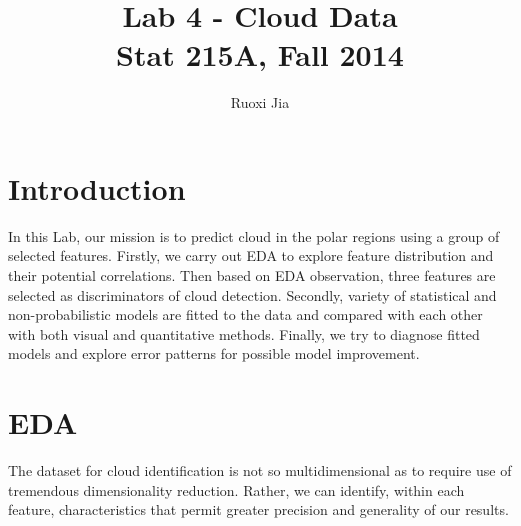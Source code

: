 \documentclass[english]{article}\usepackage{graphicx, color}
\numberwithin{equation}{section}
\numberwithin{figure}{section}
\begin{document}
\title{Lab 4 - Cloud Data\\
Stat 215A, Fall 2014}


\author{Ruoxi Jia}

\maketitle
\section{Introduction}
In this Lab, our mission is to predict cloud in the polar regions using a group 
of selected features. Firstly, we carry out EDA to explore feature distribution 
and their potential correlations. Then based on EDA observation, three 
features are selected as discriminators of cloud detection. Secondly, variety 
of  statistical and non-probabilistic models are fitted to the data and compared 
with each other with both visual and quantitative methods. Finally, we try to 
diagnose fitted models and explore error patterns for possible model improvement.

\section{EDA}
The dataset for cloud identification is not so multidimensional as to require 
use of tremendous dimensionality reduction. Rather, we can identify, within 
each feature, characteristics that permit greater precision and generality 
of our results.
\end{document}
